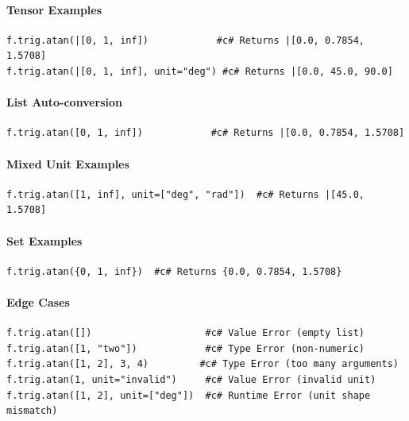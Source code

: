 \paragraph{Tensor Examples}
\begin{verbatim}
f.trig.atan(|[0, 1, inf])            #c# Returns |[0.0, 0.7854, 1.5708]
f.trig.atan(|[0, 1, inf], unit="deg") #c# Returns |[0.0, 45.0, 90.0]
\end{verbatim}

\paragraph{List Auto-conversion}
\begin{verbatim}
f.trig.atan([0, 1, inf])            #c# Returns |[0.0, 0.7854, 1.5708]
\end{verbatim}

\paragraph{Mixed Unit Examples}
\begin{verbatim}
f.trig.atan([1, inf], unit=["deg", "rad"])  #c# Returns |[45.0, 1.5708]
\end{verbatim}

\paragraph{Set Examples}
\begin{verbatim}
f.trig.atan({0, 1, inf})  #c# Returns {0.0, 0.7854, 1.5708}
\end{verbatim}

\paragraph{Edge Cases}
\begin{verbatim}
f.trig.atan([])                    #c# Value Error (empty list)
f.trig.atan([1, "two"])            #c# Type Error (non-numeric)
f.trig.atan([1, 2], 3, 4)         #c# Type Error (too many arguments)
f.trig.atan(1, unit="invalid")     #c# Value Error (invalid unit)
f.trig.atan([1, 2], unit=["deg"])  #c# Runtime Error (unit shape mismatch)
\end{verbatim}

